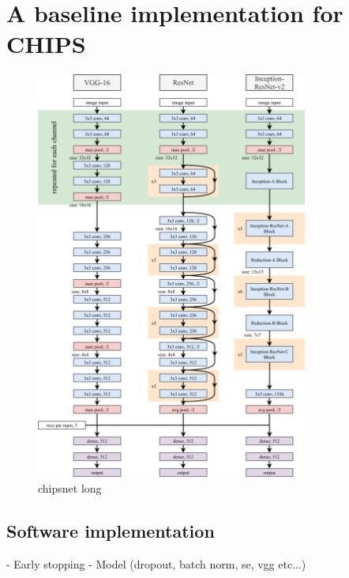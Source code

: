 \section{A baseline implementation for CHIPS} %
\label{sec:cvn_baseline} %

\begin{figure} %
    \includegraphics[width=0.8\textwidth]{diagrams/7-cvn/chipsnet.pdf}
    \caption[chipsnet short]
    {chipsnet long}
    \label{fig:chipsnet}
\end{figure}

\subsection{Software implementation} %
\label{sec:cvn_baseline_soft} %

- Early stopping
- Model (dropout, batch norm, se, vgg etc...)


